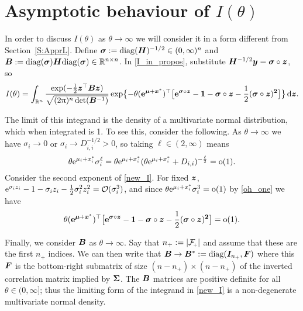 \section{Asymptotic behaviour of $I(\theta)$}\label{S:Asympt}

In order to discuss $I(\theta)$ as $\theta \to \infty$ we will consider it in
a form different from Section~\ref{S:ApprL}. Define $ \bm{\sigma} :=
\mathrm{diag}(\bm{H})^{-1/2} \in (0,\infty)^n$ and $\bm{B} :=
\mathrm{diag}(\bm{\sigma}) \bm{H} \mathrm{diag}(\bm{\sigma}) \in \mathbb{R}^{n \times
  n}$.  In \eqref{I_in_propos}, substitute $\bm{H}^{-1/2} \bm{y} = \bm{\sigma} \circ \bm{z}$, so
\begin{equation} \label{new_I}
	I(\theta) = \int_{\mathbb{R}^n}
 \frac{\exp( {-}\frac12 \bm{z}^\top \bm{B} \bm{z})}{\sqrt{(2\uppi)^n\det(\bm{B}^{-1})}}
	\exp\bigl\{{-}\theta (\text{\bf{e}}^{\bm{\mu} + \bm{x}^*})^\top \bigl[ \text{\bf{e}}^{\bm{\sigma} \circ \bm{z}} - \bm{1} - \bm{\sigma} \circ \bm{z} - \frac12(\bm{\sigma} \circ \bm{z})^{\bm{2}} \bigr] \bigr\}\mathop{}\!\mathrm{d} \bm{z} .
\end{equation}

The limit of this integrand is the density of a multivariate normal
distribution, which when integrated is 1. To see this, consider the
following. As $\theta \to \infty$ we have $\sigma_i \to 0$ or $\sigma_i
\to D_{i,i}^{-1/2} > 0$, so taking $\ell \in (2,\infty)$ means
\begin{equation} \label{oh_one}
	\theta \mathrm{e}^{\mu_i + x_i^*} \sigma_i^\ell = \theta \mathrm{e}^{\mu_i + x_i^*}
  (\theta \mathrm{e}^{\mu_i + x_i^*} + D_{i,i})^{-\frac{\ell}{2}} = {\mathrm{o}}(1) .
\end{equation}
Consider the second exponent of \eqref{new_I}. For fixed $\bm{z}$,
$\mathrm{e}^{\sigma_i z_i} - 1 - \sigma_i z_i - \frac12 \sigma_i^2 z_i^2 =
{\mathcal{O}}(\sigma_i^3)$, and since $\theta \mathrm{e}^{\mu_i + x_i^*} \sigma_i^3 = {\mathrm{o}}(1)$
by \eqref{oh_one} we have
\begin{equation} \label{second_exp_to_zero}
	\theta (\text{\bf{e}}^{\bm{\mu} + \bm{x}^*})^\top  \bigl[ \text{\bf{e}}^{\bm{\sigma} \circ \bm{z}} - \bm{1} - \bm{\sigma} \circ \bm{z} - \frac12(\bm{\sigma} \circ \bm{z})^{\bm{2}} \bigr] = {\mathrm{o}}(1) .
\end{equation}

Finally, we consider $\bm{B}$ as $\theta \to \infty$. Say that $n_{+} \defeq
\abs{\Fset{+}}$ and assume that these are the first $n_{+}$ indices. We can then
write that $\bm{B} \to \bm{B}^* := \mathrm{diag}(\bm{I}_{n_{+}}, \bm{F})$ where this
$\bm{F}$ is the bottom-right submatrix of size $(n-n_{+}) \times (n-n_{+})$ of
the inverted correlation matrix implied by $\bm{\Sigma}$. The $\bm{B}$ matrices are
positive definite for all $\theta\in(0,\infty]$; thus the limiting form of the
  integrand in \eqref{new_I} is a non-degenerate multivariate normal density.

